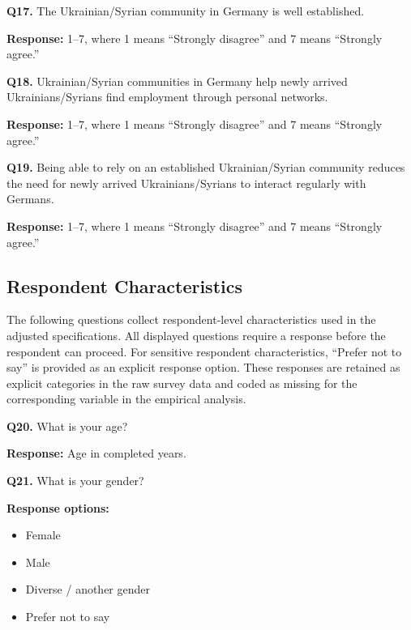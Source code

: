 \medskip

\noindent\textbf{Q17.}
The Ukrainian/Syrian community in Germany is well established.

\smallskip

\noindent
\textbf{Response:} 1--7, where 1 means ``Strongly disagree'' and
7 means ``Strongly agree.''

\medskip

\noindent\textbf{Q18.}
Ukrainian/Syrian communities in Germany help newly arrived
Ukrainians/Syrians find employment through personal networks.

\smallskip

\noindent
\textbf{Response:} 1--7, where 1 means ``Strongly disagree'' and
7 means ``Strongly agree.''

\medskip

\noindent\textbf{Q19.}
Being able to rely on an established Ukrainian/Syrian community reduces the
need for newly arrived Ukrainians/Syrians to interact regularly with Germans.

\smallskip

\noindent
\textbf{Response:} 1--7, where 1 means ``Strongly disagree'' and
7 means ``Strongly agree.''

\subsection{Respondent Characteristics}

The following questions collect respondent-level characteristics used in the
adjusted specifications. All displayed questions require a response before the respondent can proceed.
For sensitive respondent characteristics, ``Prefer not to say'' is provided
as an explicit response option. These responses are retained as explicit
categories in the raw survey data and coded as missing for the corresponding
variable in the empirical analysis.

\medskip

\noindent\textbf{Q20.}
What is your age?

\smallskip

\noindent
\textbf{Response:} Age in completed years.

\medskip

\noindent\textbf{Q21.}
What is your gender?

\smallskip

\noindent\textbf{Response options:}
\begin{itemize}
    \item Female
    \item Male
    \item Diverse / another gender
    \item Prefer not to say
\end{itemize}

